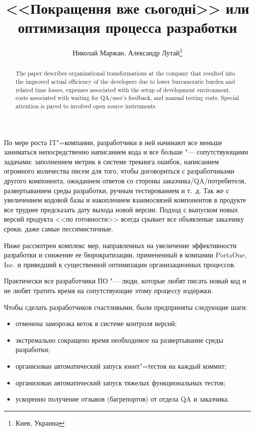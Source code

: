 \documentclass[10pt, a5paper]{article}
\begin{document}
\title{<<Покращення вже сьогодні>> или оптимизация процесса разработки}%

\author{Николай Маржан, Александр Лутай\footnote{Киев, Украина}}
\maketitle

\begin{abstract}
The paper describes organizational transformations at the company that resulted into the improved actual efficiency of the developers due to lower bureaucratic burden and related time losses, expenses associated with the setup of development environment, costs associated with waiting for QA/user’s feedback, and manual testing costs. Special attention is payed to involved open source instruments.
\end{abstract}

По мере роста IT"=компании, разработчики в ней начинают все меньше  заниматься непосредственно написанием кода и все больше "--- сопутствующими задачами: заполнением метрик в системе трекинга ошибок, написанием огромного количества писем для того, чтобы договориться с разработчиками другого компонента, ожиданием ответов со стороны заказчика/QA/потребителя, развертыванием среды разработки, ручным тестированием и т.~д. Так же с увеличением кодовой базы и накоплением взаимосвязей компонентов в продукте все труднее предсказать дату выхода новой версии. Подход с выпуском новых версий продукта <<по готовности>> всегда срывает все объявленые заказчику сроки, даже самые пессимистичные.

Ниже рассмотрен комплекс мер, направленных на увеличение эффективности разработки и снижение ее бюрократизации, примененный в компании PortaOne, Inc. и приведший к существенной оптимизации организационных процессов.

Практически все разработчики ПО "--- люди, которые любят писать новый код и не любят тратить время на сопутствующие этому процессу издержки.

Чтобы сделать разработчиков счастливыми, были предприняты следующие шаги:

\begin{itemize}
  \item отменена заморозка веток в системе контроля версий;
  \item экстремально сокращено время необходимое на развертывание среды разработки;
  \item организован автоматический запуск юнит"=тестов на каждый коммит;
  \item организован автоматический запуск тяжелых функциональных тестов;
  \item ускоренно получение отзывов (багрепортов) от отдела QA и заказчика.
\end{itemize}
\end{document}
